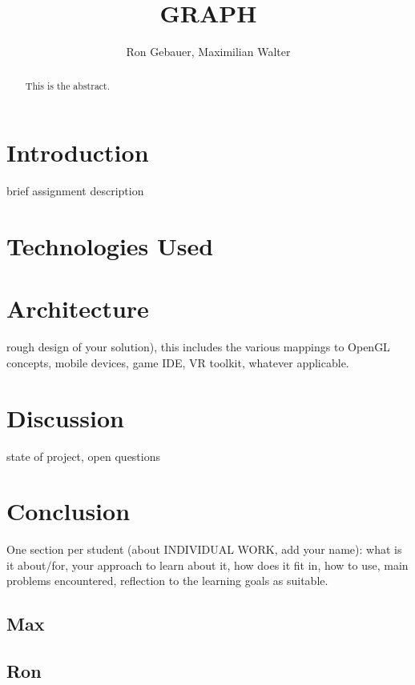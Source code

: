 \documentclass[]{article}
\title{GRAPH}
\author{Ron Gebauer, Maximilian Walter}
\begin{document}
\maketitle

\begin{abstract}
This is the abstract.
\end{abstract}

\section{Introduction}
brief assignment description
\section{Technologies Used}
\section{Architecture}
rough design of your solution), this includes the various mappings to
OpenGL concepts, mobile devices, game IDE, VR toolkit, whatever applicable.
\section{Discussion}
state of project, open questions
\section{Conclusion}
One section per student (about INDIVIDUAL WORK, add your name): what is it about/for,
your approach to learn about it, how does it fit in, how to use, main problems encountered,
reflection to the learning goals as suitable.
\subsection{Max}
\subsection{Ron}
\end{document}

